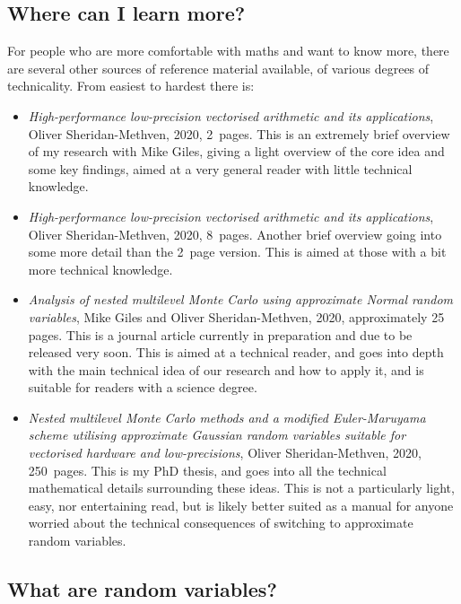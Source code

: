 \documentclass[11pt,a4paper,twoside,english]{extarticle}
\begin{document}
\subsection{Where can I learn more?}
\label{sec:where_can_i_learn_more}

For people who are more comfortable with maths and want to know more, there are several other sources of reference material available, of various degrees of technicality. From easiest to hardest there is:
\begin{itemize}
\item \emph{High-performance low-precision vectorised arithmetic and its applications}, Oliver Sheridan-Methven, 2020, 2~pages. This is an extremely brief overview of my research with Mike Giles, giving a light overview of the core idea and some key findings, aimed at a very general reader with little technical knowledge. 

\item \emph{High-performance low-precision vectorised arithmetic and its applications}, Oliver Sheridan-Methven, 2020, 8~pages. Another brief overview going into some more detail than the 2~page version. This is aimed at those with a bit more technical knowledge. 

\item \emph{Analysis of nested multilevel Monte Carlo using approximate Normal random variables}, Mike Giles and Oliver Sheridan-Methven, 2020,  approximately 25 pages. This is a journal article currently in preparation and due to be released very soon. This is aimed at a technical reader, and goes into depth with the main technical idea of our research and how to apply it, and is suitable for readers with a science degree.

\item \emph{Nested multilevel Monte Carlo methods and a modified Euler-Maruyama scheme utilising approximate Gaussian random variables suitable for vectorised hardware and low-precisions}, Oliver Sheridan-Methven, 2020, 250~pages. This is my PhD thesis, and goes into all the technical mathematical details surrounding these ideas. This is not a particularly light, easy, nor entertaining read, but is likely better suited as a manual for anyone worried about the technical consequences of switching to approximate random variables. 
\end{itemize}


\subsection{What are random variables?}
\end{document}
